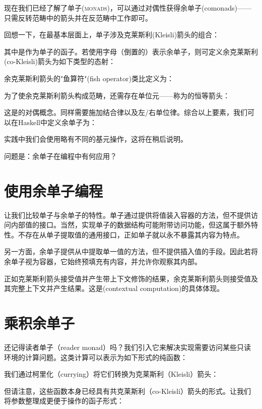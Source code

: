 
\lettrine[lhang=0.17]{现}{在我们已经了解了单子(monads)}，可以通过对偶性获得余单子(comonads)——只需反转范畴中的箭头并在反范畴中工作即可。

回想一下，在最基本层面上，单子涉及克莱斯利(Kleisli)箭头的组合：

其中是作为单子的函子。若使用字母（倒置的）表示余单子，则可定义余克莱斯利(co-Kleisli)箭头为如下类型的态射：

余克莱斯利箭头的"鱼算符"(fish operator)类比定义为：

为了使余克莱斯利箭头构成范畴，还需存在单位元——称为的恒等箭头：

这是的对偶概念。同样需要施加结合律以及左/右单位律。综合以上要素，我们可以在Haskell中定义余单子为：

实践中我们会使用略有不同的基元操作，这将在稍后说明。

问题是：余单子在编程中有何应用？

\section{使用余单子编程}

让我们比较单子与余单子的特性。单子通过提供将值装入容器的方法，但不提供访问内部值的接口。当然，实现单子的数据结构可能附带访问功能，但这属于额外特性。不存在从单子提取值的通用接口，正如单子就以永不暴露其内容为特点。

另一方面，余单子提供从中提取单一值的方法，但不提供插入值的手段。因此若将余单子视为容器，它始终预填充有内容，并允许你观察其内部。

正如克莱斯利箭头接受值并产生带上下文修饰的结果，余克莱斯利箭头则接受值及其完整上下文并产生结果。这是(contextual computation)的具体体现。

\section{乘积余单子}

还记得读者单子（reader monad）吗？我们引入它来解决实现需要访问某些只读环境的计算问题。这类计算可以表示为如下形式的纯函数：

我们通过柯里化（currying）将它们转换为克莱斯利（Kleisli）箭头：

但请注意，这些函数本身已经具有共克莱斯利（co-Kleisli）箭头的形式。让我们将参数整理成更便于操作的函子形式：

